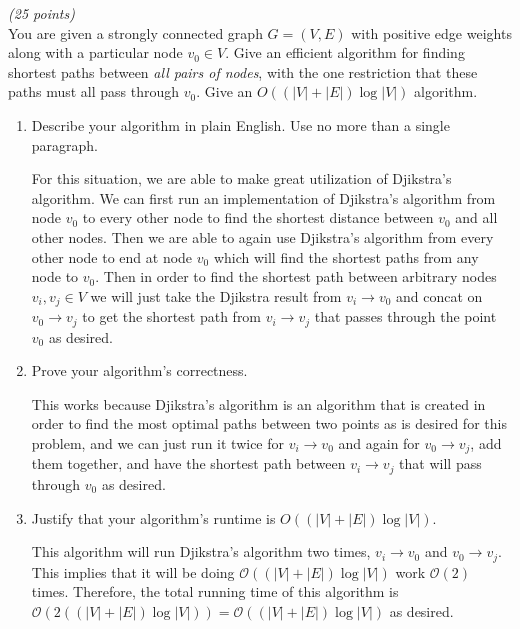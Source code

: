 \documentclass{article}
\renewcommand{\O}{\mathcal{O}}
\newcounter{ProblemCounter}
\newenvironment{problem}[1][Problem]{
 \begin{trivlist}
 \item[\hskip \labelsep {\bfseries #1}\hskip \labelsep {%
 \bfseries \theProblemCounter.%
 \stepcounter{ProblemCounter}%
 }]
}{
 \end{trivlist}
}
\begin{document}
\begin{problem}\textit{(25 points)}\\
You are given a strongly connected graph $G=(V, E)$ with positive edge weights along with a particular node $v_0\in V$.  Give an efficient algorithm for finding shortest paths between \textit{all pairs of nodes}, with the one restriction that these paths must all pass through $v_0$.  Give an $O((|V|+|E|)\log|V|)$ algorithm.
\begin{enumerate}[label=\textbf{\alph*.)}]
\item Describe your algorithm in plain English.  Use no more than a single paragraph.

For this situation, we are able to make great utilization of Djikstra's algorithm. We can first run an implementation of Djikstra's algorithm from node $v_0$ to every other node to find the shortest distance between $v_0$ and all other nodes. Then we are able to again use Djikstra's algorithm from every other node to end at node $v_0$ which will find the shortest paths from any node to $v_0.$ Then in order to find the shortest path between arbitrary nodes $v_i, v_j \in V$ we will just take the Djikstra result from $v_i \to v_0$ and concat on $v_0 \to v_j$ to get the shortest path from $v_i \to v_j$ that passes through the point $v_0$ as desired.

\item Prove your algorithm's correctness.

This works because Djikstra's algorithm is an algorithm that is created in order to find the most optimal paths between two points as is desired for this problem, and we can just run it twice for $v_i \to v_0$ and again for $v_0 \to v_j$, add them together, and have the shortest path between $v_i \to v_j$ that will pass through $v_0$ as desired.

\item Justify that your algorithm's runtime is  $O((|V|+|E|)\log|V|)$. 

This algorithm will run Djikstra's algorithm two times, $v_i\to v_0$ and $v_0 \to v_j$. This implies that it will be doing $\O((|V| + |E|) \log|V|)$ work $\O(2)$ times. Therefore, the total running time of this algorithm is $\O(2((|V| + |E|) \log |V|)) = \O((|V| + |E|) \log |V|)$ as desired.

\end{enumerate}
\end{problem}
\end{document}
